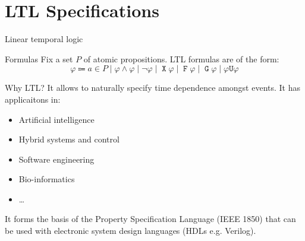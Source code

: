 \documentclass[aspectratio=169]{beamer}
\newcommand{\always}{\mathop{\mathtt{G}}}
\newcommand{\evtly}{\mathop{\mathtt{F}}}
\newcommand{\until}{\mathrel{\mathtt{U}}}
\newcommand{\nxt}{\mathop{\mathtt{X}}}
\begin{document}
\section{LTL Specifications}

\begin{frame}{Linear temporal logic}
  \begin{block}{Formulas}
    Fix a set $P$ of \alert{atomic propositions}. LTL formulas are of the
    form:
    \[
      \varphi \Coloneqq a \in P \mid \varphi \land \varphi \mid
      \lnot \varphi \mid \nxt \varphi \mid \evtly \varphi \mid
      \always \varphi \mid \varphi \until \varphi
    \]
  \end{block}

  \begin{block}{Why LTL?}
    It allows to naturally specify time dependence amongst events.
    It has applicaitons in:
    \begin{itemize}
      \item Artificial intelligence
      \item Hybrid systems and control
      \item Software engineering
      \item Bio-informatics
      \item \dots
    \end{itemize}
    It forms the basis of the \alert{Property Specification Language} (IEEE
    1850) that can be used with electronic system design languages (HDLs e.g.
    Verilog).
  \end{block}
\end{frame}
\end{document}
